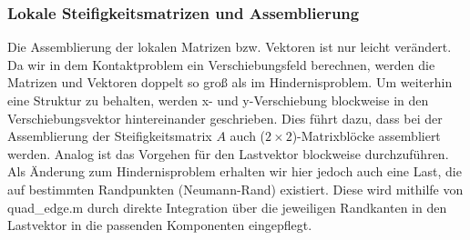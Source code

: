 \subsubsection{Lokale Steifigkeitsmatrizen und Assemblierung}

Die Assemblierung der lokalen Matrizen bzw. Vektoren ist nur leicht verändert. Da wir in dem Kontaktproblem ein Verschiebungsfeld berechnen, werden die Matrizen und Vektoren doppelt so groß als im Hindernisproblem. Um weiterhin eine Struktur zu behalten, werden x- und y-Verschiebung blockweise in den Verschiebungsvektor hintereinander geschrieben. Dies führt dazu, dass bei der Assemblierung der Steifigkeitsmatrix $A$ auch ($2\times 2$)-Matrixblöcke assembliert werden. Analog ist das Vorgehen für den Lastvektor blockweise durchzuführen. Als Änderung zum Hindernisproblem erhalten wir hier jedoch auch eine Last, die auf bestimmten Randpunkten (Neumann-Rand) existiert. Diese wird mithilfe von {\ttfamily quad_edge.m} durch direkte Integration über die jeweiligen Randkanten in den Lastvektor in die passenden Komponenten eingepflegt.

